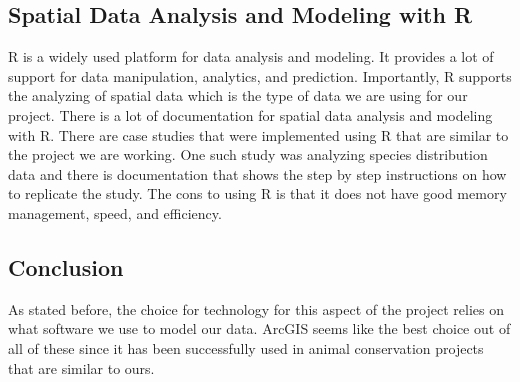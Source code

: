 \documentclass[onecolumn, draftclsnofoot,10pt, compsoc]{IEEEtran}
\begin{document}
\begin{singlespace}
\subsection{Spatial Data Analysis and Modeling with R}
R is a widely used platform for data analysis and modeling. It provides a lot of support for data manipulation, analytics, and prediction. Importantly, R supports the analyzing of spatial data which is the type of data we are using for our project. There is a lot of documentation for spatial data analysis and modeling with R. There are case studies that were implemented using R that are similar to the project we are working. One such study was analyzing species distribution data and there is documentation that shows the step by step instructions on how to replicate the study. The cons to using R is that it does not have good memory management, speed, and efficiency.

\subsection{Conclusion}
As stated before, the choice for technology for this aspect of the project relies on what software we use to model our data. ArcGIS seems like the best choice out of all of these since it has been successfully used in animal conservation projects that are similar to ours. 
\end{singlespace}

\nocite{*} %


\end{document}
